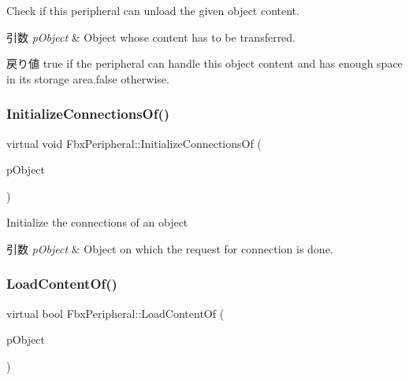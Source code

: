 Check if this peripheral can unload the given object content. 
\begin{DoxyParams}{引数}
{\em p\+Object} & Object whose content has to be transferred. \\
\hline
\end{DoxyParams}
\begin{DoxyReturn}{戻り値}
{\ttfamily true} if the peripheral can handle this object content and has enough space in its storage area.{\ttfamily false} otherwise. 
\end{DoxyReturn}
\mbox{\label{class_fbx_peripheral_a8066995ba74b61a137646fae06341f3a}} 
\subsubsection{\texorpdfstring{Initialize\+Connections\+Of()}{InitializeConnectionsOf()}}
{\footnotesize\ttfamily virtual void Fbx\+Peripheral\+::\+Initialize\+Connections\+Of (\begin{DoxyParamCaption}\item[{\hyperlink{class_fbx_object}{Fbx\+Object} $\ast$}]{p\+Object }\end{DoxyParamCaption})\hspace{0.3cm}{\ttfamily [pure virtual]}}

Initialize the connections of an object 
\begin{DoxyParams}{引数}
{\em p\+Object} & Object on which the request for connection is done. \\
\hline
\end{DoxyParams}
\mbox{\label{class_fbx_peripheral_a14cbb095a9cfeefb3d217cbfe9f507a9}} 
\subsubsection{\texorpdfstring{Load\+Content\+Of()}{LoadContentOf()}}
{\footnotesize\ttfamily virtual bool Fbx\+Peripheral\+::\+Load\+Content\+Of (\begin{DoxyParamCaption}\item[{\hyperlink{class_fbx_object}{Fbx\+Object} $\ast$}]{p\+Object }\end{DoxyParamCaption})\hspace{0.3cm}{\ttfamily [pure virtual]}}

